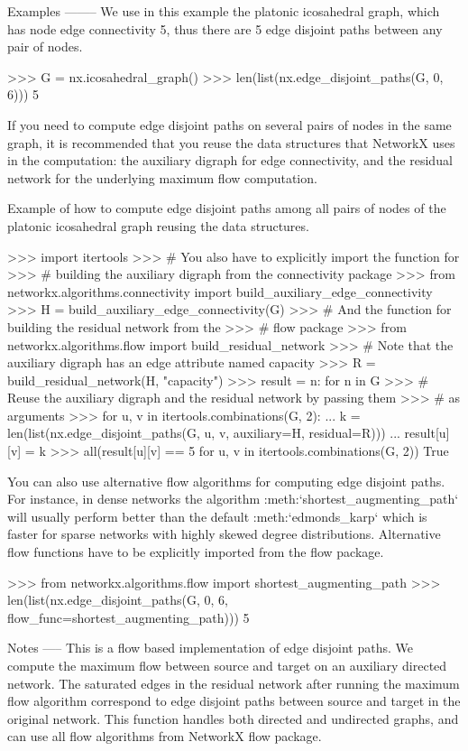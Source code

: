 \begin{DoxyVerb}
Examples
--------
We use in this example the platonic icosahedral graph, which has node
edge connectivity 5, thus there are 5 edge disjoint paths between any
pair of nodes.

>>> G = nx.icosahedral_graph()
>>> len(list(nx.edge_disjoint_paths(G, 0, 6)))
5


If you need to compute edge disjoint paths on several pairs of
nodes in the same graph, it is recommended that you reuse the
data structures that NetworkX uses in the computation: the
auxiliary digraph for edge connectivity, and the residual
network for the underlying maximum flow computation.

Example of how to compute edge disjoint paths among all pairs of
nodes of the platonic icosahedral graph reusing the data
structures.

>>> import itertools
>>> # You also have to explicitly import the function for
>>> # building the auxiliary digraph from the connectivity package
>>> from networkx.algorithms.connectivity import build_auxiliary_edge_connectivity
>>> H = build_auxiliary_edge_connectivity(G)
>>> # And the function for building the residual network from the
>>> # flow package
>>> from networkx.algorithms.flow import build_residual_network
>>> # Note that the auxiliary digraph has an edge attribute named capacity
>>> R = build_residual_network(H, "capacity")
>>> result = {n: {} for n in G}
>>> # Reuse the auxiliary digraph and the residual network by passing them
>>> # as arguments
>>> for u, v in itertools.combinations(G, 2):
...     k = len(list(nx.edge_disjoint_paths(G, u, v, auxiliary=H, residual=R)))
...     result[u][v] = k
>>> all(result[u][v] == 5 for u, v in itertools.combinations(G, 2))
True

You can also use alternative flow algorithms for computing edge disjoint
paths. For instance, in dense networks the algorithm
:meth:`shortest_augmenting_path` will usually perform better than
the default :meth:`edmonds_karp` which is faster for sparse
networks with highly skewed degree distributions. Alternative flow
functions have to be explicitly imported from the flow package.

>>> from networkx.algorithms.flow import shortest_augmenting_path
>>> len(list(nx.edge_disjoint_paths(G, 0, 6, flow_func=shortest_augmenting_path)))
5

Notes
-----
This is a flow based implementation of edge disjoint paths. We compute
the maximum flow between source and target on an auxiliary directed
network. The saturated edges in the residual network after running the
maximum flow algorithm correspond to edge disjoint paths between source
and target in the original network. This function handles both directed
and undirected graphs, and can use all flow algorithms from NetworkX flow
package.\end{DoxyVerb}

